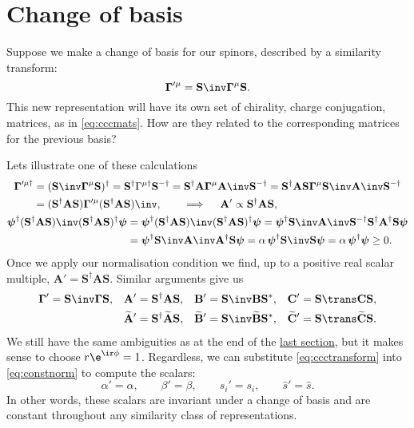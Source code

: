 \documentclass[11pt]{article}
\newcommand{\invd}{^{-\dag}}
\newcommand{\Gammab}{\boldsymbol{\Gamma}}
\newcommand{\mud}{{\mu\dag}}
\renewcommand{\S}{\mathbf{S}}
\newcommand{\A}{\mathbf{A}}
\newcommand{\B}{\mathbf{B}}
\renewcommand{\C}{\mathbf{C}}
\newcommand{\At}{\widetilde{\mathbf{A}}}
\newcommand{\Bt}{\widetilde{\mathbf{B}}}
\newcommand{\Ct}{\widetilde{\mathbf{C}}}
\newcommand{\psib}{\boldsymbol{\psi}}
\begin{document}

\section{Change of basis}\label{sec:basis}

Suppose we make a change of basis for our spinors, described by a similarity transform:
%
\begin{equation*}
  \Gammab'^{\mu} = \S\inv \Gammab^\mu \S.
\end{equation*}
%
This new representation will have its own set of chirality, charge conjugation, \etc matrices, as in \cref{eq:cccmats}.
How are they related to the corresponding matrices for the previous basis?

Lets illustrate one of these calculations
%
\begin{equation*}
\begin{gathered}
\begin{aligned}
  \Gammab'^\mud
    &= (\S\inv \Gammab^\mu \S)^\dag
    = \S^\dag \Gamma^\mud \S\invd
    = \S^\dag \A \Gammab^\mu \A\inv \S\invd
    = \S^\dag \A \S \Gammab^\mu \S\inv \A\inv \S\invd \\
    &= (\S^\dag \A \S) \Gammab'^\mu (\S^\dag \A \S)\inv,
    \qquad \implies \quad
    \A' \propto \S^\dag \A \S,
\end{aligned}
\\
\begin{aligned}
  \psib^\dag (\S^\dag \A \S)\inv (\S^\dag \A \S)^\dag \psib
    &= \psib^\dag (\S^\dag \A \S)\inv (\S^\dag \A \S)^\dag \psib
     = \psib^\dag \S\inv \A\inv \S\invd \S^\dag \A^\dag \S \psib \\
    &= \psib^\dag \S\inv \A\inv \A^\dag \S \psib
     = \alpha\, \psib^\dag \S\inv \S \psib
     = \alpha\, \psib^\dag \psib
     \geq 0.
\end{aligned}
\end{gathered}
\end{equation*}
%
Once we apply our normalisation condition we find, up to a positive real scalar multiple,
\( \A' = \S^\dag \A \S \).
Similar arguments give us
%
\begin{equation}\label{eq:ccctransform}
\begin{aligned}
  \Gammab' &= \S\inv \Gammab \S, &
  \A' &= \S^\dag \A \S, &
  \B' &= \S\inv \B \S^\ast, &
  \C' &= \S\trans \C \S,
\\ &&
  \At' &= \S^\dag \At \S, &
  \Bt' &= \S\inv \Bt \S^\ast, &
  \Ct' &= \S\trans \Ct \S.
\end{aligned}
\end{equation}
%
We still have the same ambiguities as at the end of the \hyperref[eq:constnorm]{last section}, but it makes sense to choose \( r \e^{\ir\phi} = 1 \).
Regardless, we can substitute \cref{eq:ccctransform} into \cref{eq:constnorm} to compute the scalars:
%
\begin{equation*}
  \alpha' = \alpha, \qquad
  \beta' = \beta, \qquad
  s_i' = s_i, \qquad
  \hat{s}' = \hat{s}.
\end{equation*}
%
In other words, these scalars are invariant under a change of basis and are constant throughout any similarity class of representations.
\end{document}
